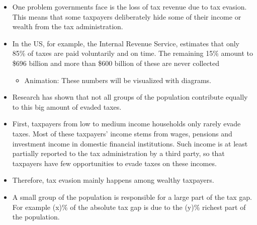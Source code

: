 \documentclass[11pt]{article}
\begin{document}
\begin{itemize}
    \item One problem governments face is the loss of tax revenue due to tax evasion. This means that some taxpayers deliberately hide some of their income or wealth from the tax administration. 
    \item In the US, for example, the Internal Revenue Service, estimates that only 85\% of taxes are paid voluntarily and on time. The remaining 15\% amount to \$696 billion and more than \$600 billion of these are never collected
    \begin{itemize}
        \item Animation: These numbers will be visualized with diagrams.
    \end{itemize}
    \item Research has shown that not all groups of the population contribute equally to this big amount of evaded taxes. 
    \item First, taxpayers from low to medium income households only rarely evade taxes. Most of these taxpayers’ income stems from wages, pensions and investment income in domestic financial institutions. Such income is at least partially reported to the tax administration by a third party, so that taxpayers have few opportunities to evade taxes on these incomes. 
    \item Therefore, tax evasion mainly happens among wealthy taxpayers.
    \item A small group of the population is responsible for a large part of the tax gap. For example (x)\% of the absolute tax gap is due to the (y)\% richest part of the population. 

\end{itemize}
\end{document}
